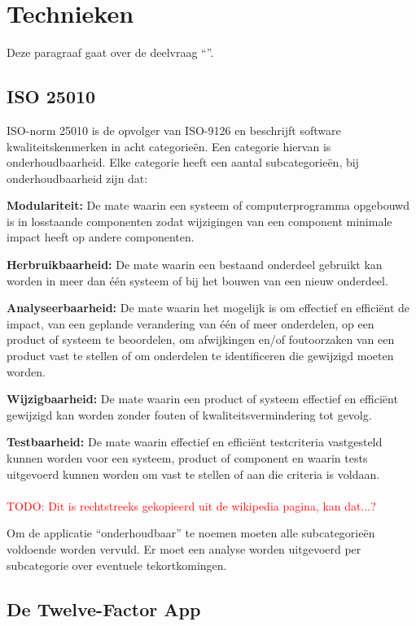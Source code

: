 \chapter{Technieken}

\label{Chapter3}

Deze paragraaf gaat over de deelvraag \enquote{\deeltechnieken}.

\section{ISO 25010}

ISO-norm 25010 \parencite{ISO25010} is de opvolger van ISO-9126 en beschrijft software kwaliteitskenmerken in acht categorieën. Een categorie hiervan is onderhoudbaarheid. Elke categorie heeft een aantal subcategorieën, bij onderhoudbaarheid zijn dat:

\textbf{Modulariteit:} De mate waarin een systeem of computerprogramma opgebouwd is in losstaande componenten zodat wijzigingen van een component minimale impact heeft op andere componenten.

\textbf{Herbruikbaarheid:} De mate waarin een bestaand onderdeel gebruikt kan worden in meer dan één systeem of bij het bouwen van een nieuw onderdeel.

\textbf{Analyseerbaarheid:} De mate waarin het mogelijk is om effectief en efficiënt de impact, van een geplande verandering van één of meer onderdelen, op een product of systeem te beoordelen, om afwijkingen en/of foutoorzaken van een product vast te stellen of om onderdelen te identificeren die gewijzigd moeten worden.

\textbf{Wijzigbaarheid:} De mate waarin een product of systeem effectief en efficiënt gewijzigd kan worden zonder fouten of kwaliteitsvermindering tot gevolg.

\textbf{Testbaarheid:} De mate waarin effectief en efficiënt testcriteria vastgesteld kunnen worden voor een systeem, product of component en waarin tests uitgevoerd kunnen worden om vast te stellen of aan die criteria is voldaan.
\\\\
\textcolor{red}{TODO: Dit is rechtstreeks gekopieerd uit de wikipedia pagina, kan dat...?} %

Om de applicatie \enquote{onderhoudbaar} te noemen moeten alle subcategorieën voldoende worden vervuld. Er moet een analyse worden uitgevoerd per subcategorie over eventuele tekortkomingen.


\section{De Twelve-Factor App}

